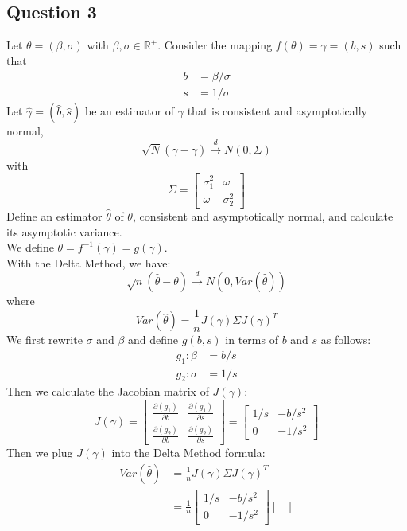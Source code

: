 \documentclass[12pt]{article}
\begin{document}
\begin{flushleft}
\subsection*{Question 3}
Let $\theta=(\beta,\sigma)$ with $\beta,\sigma\in\mathbb{R}^+$. Consider the mapping $f(\theta)=\gamma=(b,s)$ such that
\begin{align*}
    b&=\beta/\sigma\\
    s&=1/\sigma
\end{align*}
Let $\hat{\gamma}=(\hat{b},\hat{s})$ be an estimator of $\gamma$ that is consistent and asymptotically normal,
\[
\sqrt{N}(\hat{\gamma}-\gamma)\xrightarrow{d}N(0,\Sigma)
\]
with
\[
\Sigma=\begin{bmatrix}
    \sigma_1^2 & \omega\\
    \omega & \sigma_2^2
\end{bmatrix}
\]
Define an estimator $\hat{\theta}$ of $\theta$, consistent and asymptotically normal, and calculate its asymptotic variance.\\
We define $\theta=f^{-1}(\gamma)=g(\gamma)$.\\
With the Delta Method, we have:
\[
\sqrt{n}(\hat{\theta}-\theta)\xrightarrow{d}N(0,Var(\hat{\theta}))
\]
where
\[
Var(\hat{\theta})=\frac{1}{n}J(\gamma)\Sigma J(\gamma)^T
\] 
We first rewrite $\sigma$ and $\beta$ and define $g(b,s)$ in terms of $b$ and $s$ as follows:
\begin{align*}
    g_1:\beta&=b/s\\
    g_2:\sigma&=1/s
\end{align*}
Then we calculate the Jacobian matrix of $J(\gamma)$:
\[
J(\gamma)
=\begin{bmatrix}
    \frac{\partial(g_1)}{\partial b} & \frac{\partial (g_1)}{\partial s}\\
    \frac{\partial(g_2)}{\partial b} & \frac{\partial (g_2)}{\partial s}
\end{bmatrix}
=\begin{bmatrix}
    1/s & -b/s^2\\
    0 & -1/s^2
\end{bmatrix}
\]
Then we plug $J(\gamma)$ into the Delta Method formula:
\begin{align*}
Var(\hat{\theta})&=\frac{1}{n}J(\gamma)\Sigma J(\gamma)^T\\
&=\frac{1}{n}\begin{bmatrix}
    1/s & -b/s^2\\
    0 & -1/s^2
\end{bmatrix}
\begin{bmatrix}

\end{bmatrix}
\end{align*}
\end{flushleft}
\end{document}

